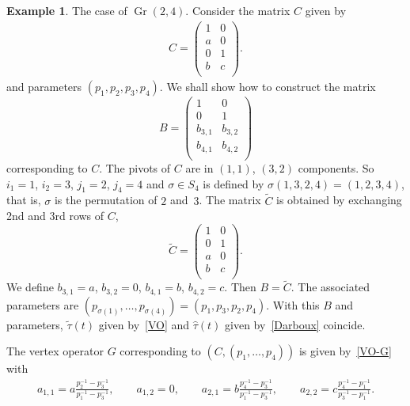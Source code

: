 \documentclass[pdftex]{sigma}
\numberwithin{equation}{section}
\theoremstyle{definition}
\newtheorem{Example}[Theorem]{Example}
\begin{document}
\begin{Example}\label{example-gr24} The case of $\operatorname{Gr}(2,4)$.
Consider the matrix $C$ given by
\begin{gather}
 C=\left(
 \begin{matrix}
 1&0\\
 a&0\\
 0&1\\
 b&c\\
 \end{matrix}
 \right).
 \label{C-example}
 \end{gather}
 and parameters $(p_1,p_2,p_3,p_4)$.
 We shall show how to construct the matrix
\[
 B=\left(
 \begin{matrix}
 1&0\\
 0&1\\
 b_{3,1}&b_{3,2}\\
 b_{4,1}&b_{4,2}\\
 \end{matrix}
 \right)
 \label{B-example}
 \]
 corresponding to $C$.
 The pivots of $C$ are in $(1,1)$, $(3,2)$ components. So $i_1=1$, $i_2=3$, $j_1=2$, $j_4=4$ and $\sigma\in S_4$ is defined by $\sigma(1,3,2,4)=(1,2,3,4)$, that is, $\sigma$ is the permutation of $2$ and~$3$. The matrix $\tilde{C}$ is obtained by exchanging
 2nd and 3rd rows of $C$,
 \[
 \tilde{C}=\left(
 \begin{matrix}
 1&0\\
 0&1\\
 a&0\\
 b&c\\
 \end{matrix}
 \right).
 \label{C-tilde-example}
 \]
 We define $b_{3,1}=a$, $b_{3,2}=0$, $b_{4,1}=b$, $b_{4,2}=c$. Then $B=\tilde{C}$.
 The associated parameters are $(p_{\sigma(1)},\dots ,p_{\sigma(4)})=(p_1,p_3,p_2,p_4)$.
 With this $B$ and parameters, $\tilde{\tau}(t)$ given by~\eqref{VO} and
 $\widehat{\tau}(t)$ given by~\eqref{Darboux} coincide.

 The vertex operator $G$ corresponding to $(C,(p_1,\dots ,p_4))$ is given by~\eqref{VO-G} with
 \begin{gather*}
 a_{1,1}=a\frac{p_2^{-1}-p_3^{-1}}{p_1^{-1}-p_3^{-1}},
 \qquad
 a_{1,2}=0,
\qquad
 a_{2,1}=b\frac{p_4^{-1}-p_3^{-1}}{p_1^{-1}-p_3^{-1}},
 \qquad
 a_{2,2}=c\frac{p_4^{-1}-p_1^{-1}}{p_3^{-1}-p_1^{-1}}.
 \end{gather*}
 \end{Example}
\end{document}
